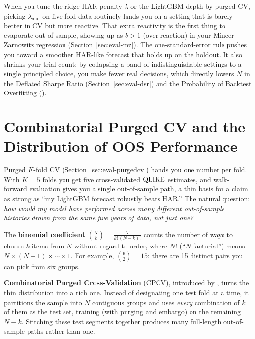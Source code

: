 \begin{projectconnection}
When you tune the ridge-HAR penalty $\lambda$ or the LightGBM depth by purged CV, picking $\lambda_{\min}$ on five-fold data routinely lands you on a setting that is barely better in CV but more reactive.
That extra reactivity is the first thing to evaporate out of sample, showing up as $b > 1$ (over-reaction) in your Mincer--Zarnowitz regression (Section~\ref{sec:eval-mz}).
The one-standard-error rule pushes you toward a smoother HAR-like forecast that holds up on the holdout.
It also shrinks your trial count: by collapsing a band of indistinguishable settings to a single principled choice, you make fewer real decisions, which directly lowers $N$ in the Deflated Sharpe Ratio (Section~\ref{sec:eval-dsr}) and the Probability of Backtest Overfitting ().
\end{projectconnection}


\section{Combinatorial Purged CV and the Distribution of OOS Performance}
\label{sec:ch16:cpcv}

Purged $K$-fold CV (Section~\ref{sec:eval-purgedcv}) hands you one number per fold.
With $K = 5$ folds you get five cross-validated $\operatorname{QLIKE}$ estimates, and walk-forward evaluation gives you a single out-of-sample path, a thin basis for a claim as strong as ``my LightGBM forecast robustly beats HAR.''
The natural question: \emph{how would my model have performed across many different out-of-sample histories drawn from the same five years of data, not just one?}

\begin{prereq}
The \textbf{binomial coefficient} $\binom{N}{k} = \frac{N!}{k!\,(N-k)!}$ counts the number of ways to choose $k$ items from $N$ without regard to order, where $N!$ (``$N$ factorial'') means $N \times (N-1) \times \cdots \times 1$.
For example, $\binom{6}{2} = 15$: there are 15 distinct pairs you can pick from six groups.
\end{prereq}

\textbf{Combinatorial Purged Cross-Validation} (CPCV), introduced by \citet{LopezdePrado2018}, turns the thin distribution into a rich one.
Instead of designating one test fold at a time, it partitions the sample into $N$ contiguous groups and uses \emph{every} combination of $k$ of them as the test set, training (with purging and embargo) on the remaining $N-k$.
Stitching these test segments together produces many full-length out-of-sample paths rather than one.

